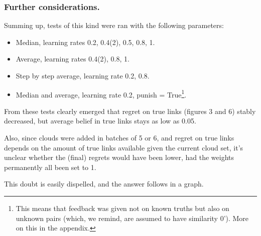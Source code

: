\documentclass[11pt]{article}
\begin{document}
\subsubsection{Further considerations.}

Summing up, tests of this kind were ran with the following parameters:

\begin{itemize}
\item Median, learning rates 0.2, 0.4(2), 0.5, 0.8, 1.

\item Average, learning rates 0.4(2), 0.8, 1.

\item Step by step average, learning rate 0.2, 0.8.

\item Median and average, learning rate 0.2, punish = True\footnote{This means that feedback was given not on known truths but also on unknown pairs (which, we remind, are assumed to have similarity $0$'). More on this in the appendix.}.
\end{itemize}

From these tests clearly emerged that regret on true links (figures 3 and 6) stably decreased, but average belief in true links stays as low as 0.05.

Also, since clouds were added in batches of 5 or 6, and regret on true links depends on the amount of true links available given the current cloud set, it's unclear whether the (final) regrets would have been lower, had the weights permanently all been set to 1.

This doubt is easily dispelled, and the answer follows in a graph. 
\end{document}
